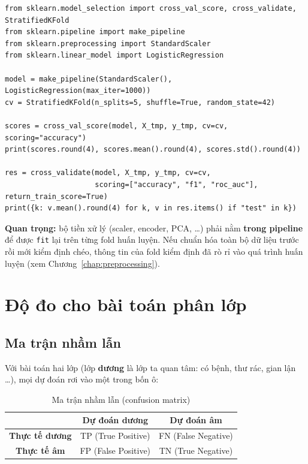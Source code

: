 \begin{lstlisting}[caption={Kiểm định chéo với cross\_val\_score và cross\_validate}]
from sklearn.model_selection import cross_val_score, cross_validate, StratifiedKFold
from sklearn.pipeline import make_pipeline
from sklearn.preprocessing import StandardScaler
from sklearn.linear_model import LogisticRegression

model = make_pipeline(StandardScaler(), LogisticRegression(max_iter=1000))
cv = StratifiedKFold(n_splits=5, shuffle=True, random_state=42)

scores = cross_val_score(model, X_tmp, y_tmp, cv=cv, scoring="accuracy")
print(scores.round(4), scores.mean().round(4), scores.std().round(4))

res = cross_validate(model, X_tmp, y_tmp, cv=cv,
                     scoring=["accuracy", "f1", "roc_auc"], return_train_score=True)
print({k: v.mean().round(4) for k, v in res.items() if "test" in k})
\end{lstlisting}

\noindent\textbf{Quan trọng:} bộ tiền xử lý (scaler, encoder, PCA, \dots) phải nằm \textbf{trong pipeline} để được \texttt{fit} lại trên từng fold huấn luyện. Nếu chuẩn hóa toàn bộ dữ liệu trước rồi mới kiểm định chéo, thông tin của fold kiểm định đã rò rỉ vào quá trình huấn luyện (xem Chương~\ref{chap:preprocessing}).

\section{Độ đo cho bài toán phân lớp}

\subsection{Ma trận nhầm lẫn}

Với bài toán hai lớp (lớp \textbf{dương} là lớp ta quan tâm: có bệnh, thư rác, gian lận \dots), mọi dự đoán rơi vào một trong bốn ô:

\begin{table}[H]
\centering
\begin{tabular}{|c|c|c|}
\hline
 & \textbf{Dự đoán dương} & \textbf{Dự đoán âm} \\
\hline
\textbf{Thực tế dương} & TP (True Positive) & FN (False Negative) \\ \hline
\textbf{Thực tế âm} & FP (False Positive) & TN (True Negative) \\ \hline
\end{tabular}
\caption{Ma trận nhầm lẫn (confusion matrix)}
\end{table}


